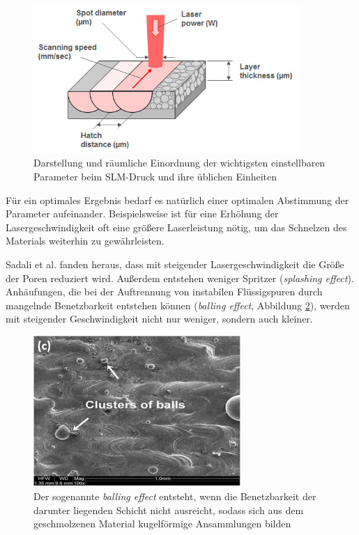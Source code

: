 		\begin{figure}[!ht]
			\centering
			\includegraphics[width=0.9\textwidth]{chapter/main/img/slm_parameters.jpg}
			\caption{Darstellung und räumliche Einordnung der wichtigsten einstellbaren Parameter
			beim SLM-Druck und ihre üblichen Einheiten \cite{saunders2017x}}
			\label{fig:slm_parameters}
		\end{figure}

		Für ein optimales Ergebnis bedarf es natürlich einer optimalen Abstimmung der Parameter
		aufeinander. Beispielsweise ist für eine Erhöhung der Lasergeschwindigkeit oft eine
		größere Laserleistung nötig, um das Schnelzen des Materials weiterhin zu gewährleisten.

		Sadali et al. fanden heraus, dass mit steigender Lasergeschwindigkeit die Größe der Poren
		reduziert wird. Außerdem entstehen weniger Spritzer (\emph{splashing effect}). Anhäufungen,
		die bei der Auftrennung von instabilen Flüssigspuren durch mangelnde Benetzbarkeit
		entstehen können (\emph{balling effect}, Abbildung \ref{fig:defects_balling}), werden mit
		steigender Geschwindigkeit nicht nur weniger, sondern auch kleiner.

		\begin{figure}[!ht]
			\centering
			\includegraphics[width=0.7\textwidth]{chapter/main/img/defects/balling.png}
			\caption{Der sogenannte \emph{balling effect} entsteht, wenn die Benetzbarkeit der
			darunter liegenden Schicht nicht ausreicht, sodass sich aus dem geschmolzenen
			Material kugelförmige Ansammlungen bilden \cite{eskandarisabzi2019defect}}
			\label{fig:defects_balling}
		\end{figure}

